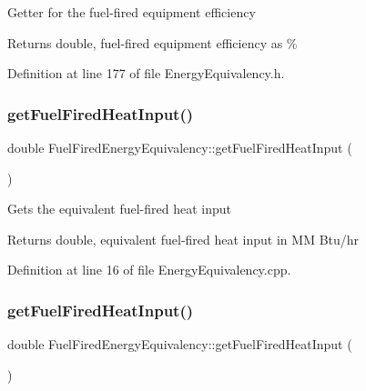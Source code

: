 Getter for the fuel-\/fired equipment efficiency

\begin{DoxyReturn}{Returns}
double, fuel-\/fired equipment efficiency as \% 
\end{DoxyReturn}


Definition at line 177 of file Energy\+Equivalency.\+h.

\mbox{\label{class_fuel_fired_energy_equivalency_a6bf68595ca361dd4135d0c84c2fbe6d9}} 
\subsubsection{\texorpdfstring{get\+Fuel\+Fired\+Heat\+Input()}{getFuelFiredHeatInput()}\hspace{0.1cm}{\footnotesize\ttfamily [1/3]}}
{\footnotesize\ttfamily double Fuel\+Fired\+Energy\+Equivalency\+::get\+Fuel\+Fired\+Heat\+Input (\begin{DoxyParamCaption}{ }\end{DoxyParamCaption})}

Gets the equivalent fuel-\/fired heat input \begin{DoxyReturn}{Returns}
double, equivalent fuel-\/fired heat input in MM Btu/hr 
\end{DoxyReturn}


Definition at line 16 of file Energy\+Equivalency.\+cpp.

\mbox{\label{class_fuel_fired_energy_equivalency_a6bf68595ca361dd4135d0c84c2fbe6d9}} 
\subsubsection{\texorpdfstring{get\+Fuel\+Fired\+Heat\+Input()}{getFuelFiredHeatInput()}\hspace{0.1cm}{\footnotesize\ttfamily [2/3]}}
{\footnotesize\ttfamily double Fuel\+Fired\+Energy\+Equivalency\+::get\+Fuel\+Fired\+Heat\+Input (\begin{DoxyParamCaption}{ }\end{DoxyParamCaption})}

